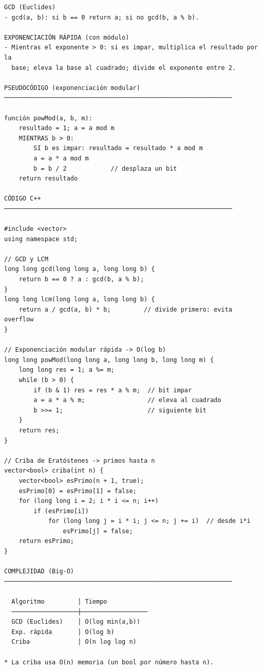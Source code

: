 \begin{lstlisting}
GCD (Euclides)
- gcd(a, b): si b == 0 return a; si no gcd(b, a % b).

EXPONENCIACIÓN RÁPIDA (con módulo)
- Mientras el exponente > 0: si es impar, multiplica el resultado por la
  base; eleva la base al cuadrado; divide el exponente entre 2.

PSEUDOCÓDIGO (exponenciación modular)
──────────────────────────────────────────────────────────────

función powMod(a, b, m):
    resultado = 1; a = a mod m
    MIENTRAS b > 0:
        SI b es impar: resultado = resultado * a mod m
        a = a * a mod m
        b = b / 2            // desplaza un bit
    return resultado

CÓDIGO C++
──────────────────────────────────────────────────────────────

#include <vector>
using namespace std;

// GCD y LCM
long long gcd(long long a, long long b) {
    return b == 0 ? a : gcd(b, a % b);
}
long long lcm(long long a, long long b) {
    return a / gcd(a, b) * b;         // divide primero: evita overflow
}

// Exponenciación modular rápida -> O(log b)
long long powMod(long long a, long long b, long long m) {
    long long res = 1; a %= m;
    while (b > 0) {
        if (b & 1) res = res * a % m;  // bit impar
        a = a * a % m;                 // eleva al cuadrado
        b >>= 1;                       // siguiente bit
    }
    return res;
}

// Criba de Eratóstenes -> primos hasta n
vector<bool> criba(int n) {
    vector<bool> esPrimo(n + 1, true);
    esPrimo[0] = esPrimo[1] = false;
    for (long long i = 2; i * i <= n; i++)
        if (esPrimo[i])
            for (long long j = i * i; j <= n; j += i)  // desde i*i
                esPrimo[j] = false;
    return esPrimo;
}

COMPLEJIDAD (Big-O)
──────────────────────────────────────────────────────────────

  Algoritmo         │ Tiempo
  ──────────────────┼──────────────────
  GCD (Euclides)    │ O(log min(a,b))
  Exp. rápida       │ O(log b)
  Criba             │ O(n log log n)

* La criba usa O(n) memoria (un bool por número hasta n).
\end{lstlisting}

